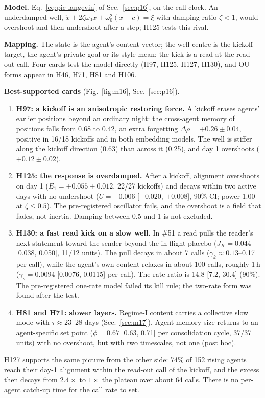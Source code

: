 \textbf{Model.} Eq.~\eqref{eq:pic-langevin} of Sec.~\ref{sec:p16}, on the call clock. An underdamped well, $\ddot x+2\zeta\omega_0\dot x+\omega_0^2(x-c)=\xi$ with damping ratio $\zeta<1$, would overshoot and then undershoot after a step; H125 tests this rival.

\textbf{Mapping.} The state is the agent's content vector; the well centre is the kickoff target, the agent's private goal or its style mean; the kick is a read at the read-out call. Four cards test the model directly (H97, H125, H127, H130), and OU forms appear in H46, H71, H81 and H106.

\textbf{Best-supported cards} (Fig.~\ref{fig:m16}, Sec.~\ref{sec:p16}).
\begin{enumerate}
\item \textbf{H97: a kickoff is an anisotropic restoring force.} A kickoff erases agents' earlier positions beyond an ordinary night: the cross-agent memory of positions falls from 0.68 to 0.42, an extra forgetting $\Delta\rho=+0.26\pm0.04$, positive in 16/18 kickoffs and in both embedding models. The well is stiffer along the kickoff direction (0.63) than across it (0.25), and day 1 overshoots ($+0.12\pm0.02$).
\item \textbf{H125: the response is overdamped.} After a kickoff, alignment overshoots on day 1 ($E_1=+0.055\pm0.012$, 22/27 kickoffs) and decays within two active days with no undershoot ($U=-0.006$ [$-0.020$, $+0.008$], 90\% CI; power 1.00 at $\zeta\le0.5$). The pre-registered oscillator fails, and the overshoot is a field that fades, not inertia. Damping between 0.5 and 1 is not excluded.
\item \textbf{H130: a fast read kick on a slow well.} In \#51 a read pulls the reader's next statement toward the sender beyond the in-flight placebo ($J_K=0.044$ [0.038, 0.050], 11/12 units). The pull decays in about 7 calls ($\gamma_k\approx0.13$--0.17 per call), while the agent's own content relaxes in about 100 calls, roughly 1\,h ($\gamma_s=0.0094$ [0.0076, 0.0115] per call). The rate ratio is 14.8 [7.2, 30.4] (90\%). The pre-registered one-rate model failed its kill rule; the two-rate form was found after the test.
\item \textbf{H81 and H71: slower layers.} Regime-I content carries a collective slow mode with $\tau\approx23$--28 days (Sec.~\ref{sec:m17}). Agent memory size returns to an agent-specific set point ($\phi=0.67$ [0.63, 0.71] per consolidation cycle, 37/37 units) with no overshoot, but with two timescales, not one (post hoc).
\end{enumerate}
H127 supports the same picture from the other side: 74\% of 152 rising agents reach their day-1 alignment within the read-out call of the kickoff, and the excess then decays from $2.4\times$ to $1\times$ the plateau over about 64 calls. There is no per-agent catch-up time for the call rate to set.

